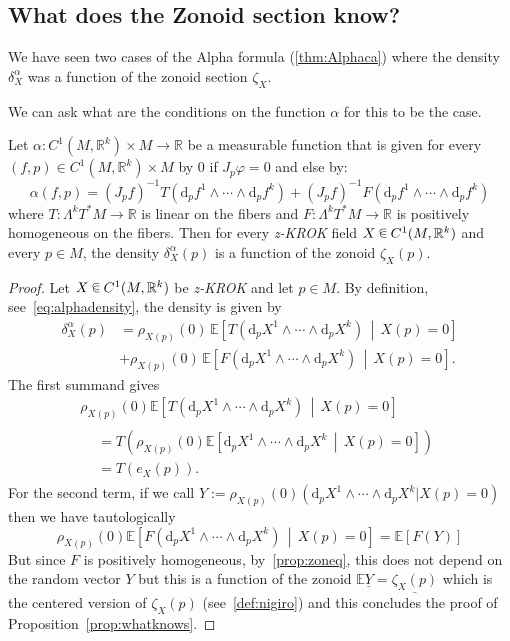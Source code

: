 \documentclass[10pt]{amsart}
\theoremstyle{definition}\newtheorem{defi}[theo]{Definition}\newtheorem{rema}[theo]{Remark}\newtheorem{exam}[theo]{Example}\newtheorem{exem}[theo]{Example}\newtheorem{nota}[theo]{Notation}
\newcommand{\R}{\mathbb{R}}
\newcommand{\EE}{\mathbb{E}}
\newcommand{\dd}{\mathrm{d}}
\newcommand{\seg}{\underline}
\newcommand{\zkrok}{\emph{z-KROK}\xspace}
\newcommand*\randin{
\mathchoice {\raisebox{-.35ex}{$\displaystyle{^\subset}$}\mkern-11.5mu\raisebox{+.45ex}{$\displaystyle{_\subset}$}} {\mkern+1mu\raisebox{-.27ex}{$\textstyle{^\subset}$}\mkern-11.7mu\raisebox{+.45ex}{$\textstyle{_\subset}$}} {\raisebox{.35ex}{$\scriptstyle\subset$}\mkern-14mu\raisebox{-.15ex}{$\scriptstyle\subset$}} {\raisebox{.3ex}{$\scriptscriptstyle\subset$}\mkern-13.5mu\raisebox{-.10ex}{$\scriptscriptstyle\subset$}}}
\begin{document}
\subsection{What does the Zonoid section know?}\label{sub:whatdoesitknow}
We have seen two cases of the Alpha formula (\cref{thm:Alphaca}) where the density $\delta^\alpha_X$ was a function of the zonoid section $\zeta_X$.

We can ask what are the conditions on the function $\alpha$ for this to be the case.

\begin{prop}\label{prop:whatknows}
Let $\alpha:C^1(M,\R^k)\times M\to \R$ be a measurable function that is given for every $(f,p)\in C^1(M,\R^k)\times M$ by $0$ if $J_p\varphi=0$ and else by:
\begin{equation}
\alpha(f,p)= (J_pf)^{-1}T\left(\dd_pf^1\wedge \cdots\wedge \dd_pf^k\right)+(J_pf)^{-1}F\left(\dd_pf^1\wedge \cdots\wedge \dd_pf^k\right)
\end{equation}
where $T:\Lambda^kT^*M\to \R$ is linear on the fibers and $F:\Lambda^kT^*M\to \R$ is positively homogeneous on the fibers. Then for every \zkrok field $X\,\randin\, C^1(M,\R^k)$ and every $p\in M$, the density $\delta_X^\alpha(p)$ is a function of the zonoid $\zeta_X(p)$.
\end{prop}

\begin{proof}
Let $X\,\randin\, C^1(M,\R^k)$ be \zkrok and let $p\in M$. By definition, see~\eqref{eq:alphadensity}, the density is given by
\begin{align*}
\delta_X^\alpha(p) &=\rho_{X(p)}(0)\, \EE\left[T\left(\dd_pX^1\wedge \cdots\wedge \dd_pX^k\right)\,\middle|\,X(p)=0\right] \\
&+\rho_{X(p)}(0)\, \EE\left[F\left(\dd_pX^1\wedge \cdots\wedge \dd_pX^k\right)\,\middle|\,X(p)=0\right].
\end{align*}
The first summand gives
\begin{multline}
\rho_{X(p)}(0)\EE\left[T\left(\dd_pX^1\wedge \cdots\wedge \dd_pX^k\right)\,\middle|\,X(p)=0\right]\\
\begin{aligned}
&=T\left(\rho_{X(p)}(0)\EE\left[\dd_pX^1\wedge \cdots\wedge \dd_pX^k\,\middle|\,X(p)=0\right]\right) \\
&=T(e_X(p)).
\end{aligned}
\end{multline}
For the second term, if we call $Y:=\rho_{X(p)}(0)(\dd_pX^1\wedge \cdots\wedge \dd_pX^k|X(p)=0)$ then we have tautologically
\begin{equation*}
\rho_{X(p)}(0)\EE\left[F\left(\dd_pX^1\wedge \cdots\wedge \dd_pX^k\right)\,\middle|\,X(p)=0\right]=\EE\left[F(Y)\right]
\end{equation*}
But since $F$ is positively homogeneous, by~\cref{prop:zoneq}, this does not depend on the random vector $Y$ but this is a function of the zonoid $\EE\seg{Y}=\seg{\zeta_X(p)}$ which is the centered version of $\zeta_X(p)$ (see~\cref{def:nigiro}) and this concludes the proof of Proposition~\ref{prop:whatknows}.
\end{proof}
\end{document}
